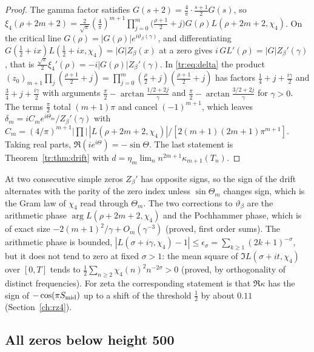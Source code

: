 \begin{proof}
The gamma factor satisfies $G(s+2)=\frac4\pi\cdot\frac{s+1}2G(s)$, so $\xi_4(\rho+2m+2)=\frac2{\sqrt\pi}(\frac4\pi)^{m+1}\prod_{j=0}^m\big(\frac{\rho+1}2+j\big)G(\rho)L(\rho+2m+2,\chi_4)$. On the critical line $G(\rho)=|G(\rho)|e^{i\vartheta_\beta(\gamma)}$, and differentiating $G(\frac12+ix)L(\frac12+ix,\chi_4)=|G|Z_\beta(x)$ at a zero gives $i\,GL'(\rho)=|G|Z_\beta'(\gamma)$, that is $\frac{\sqrt\pi}2\xi_4'(\rho)=-i|G(\rho)|Z_\beta'(\gamma)$. In \eqref{tr:eq:delta} the product $(z_0)_{m+1}\prod_j(\frac{\rho+1}2+j)=\prod_{j=0}^m(\frac\rho2+j)(\frac{\rho+1}2+j)$ has factors $\frac14+j+\frac{i\gamma}2$ and $\frac34+j+\frac{i\gamma}2$ with arguments $\frac\pi2-\arctan\frac{1/2+2j}\gamma$ and $\frac\pi2-\arctan\frac{3/2+2j}\gamma$ for $\gamma>0$. The terms $\frac\pi2$ total $(m+1)\pi$ and cancel $(-1)^{m+1}$, which leaves $\delta_m=iC_m e^{i\Theta_m}/Z_\beta'(\gamma)$ with $C_m=(4/\pi)^{m+1}|\prod|\,|L(\rho+2m+2,\chi_4)|/[2(m+1)(2m+1)\pi^{m+1}]$. Taking real parts, $\Re(ie^{i\Theta})=-\sin\Theta$. The last statement is Theorem~\ref{tr:thm:drift} with $d=\eta_m\lim_nn^{2m+1}\kappa_{m+1}(T_n)$.
\end{proof}

At two consecutive simple zeros $Z_\beta'$ has opposite signs, so the sign of the drift alternates with the parity of the zero index unless $\sin\Theta_m$ changes sign, which is the Gram law of $\chi_4$ read through $\Theta_m$. The two corrections to $\vartheta_\beta$ are the arithmetic phase $\arg L(\rho+2m+2,\chi_4)$ and the Pochhammer phase, which is of exact size $-2(m+1)^2/\gamma+O_m(\gamma^{-3})$ (proved, first order sums). The arithmetic phase is bounded, $|L(\sigma+i\gamma,\chi_4)-1|\le\epsilon_\sigma=\sum_{k\ge1}(2k+1)^{-\sigma}$, but it does not tend to zero at fixed $\sigma>1$: the mean square of $\Im L(\sigma+it,\chi_4)$ over $[0,T]$ tends to $\frac12\sum_{n\ge2}\chi_4(n)^2n^{-2\sigma}>0$ (proved, by orthogonality of distinct frequencies). For zeta the corresponding statement is that $\Re\kappa$ has the sign of $-\cos(\pi S_{\rm mid})$ up to a shift of the threshold $\frac12$ by about $0.11$ (Section~\ref{ch:rz4}).

\subsection{All zeros below height 500}

